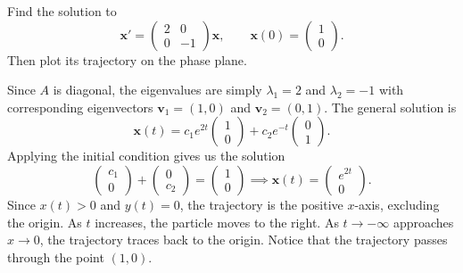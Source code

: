 \documentclass[11pt,letterpaper]{article}
\begin{document}
\begin{example}[1]{
Find the solution to 
\[
\mathbf{x}'=\begin{pmatrix}2&0\\0&-1\end{pmatrix}\mathbf{x},\qquad
\mathbf{x}(0)=\begin{pmatrix}1\\0\end{pmatrix}.
\]
Then plot its trajectory on the phase plane.
}

Since $A$ is diagonal, the eigenvalues are simply $\lambda_1=2$ and $\lambda_2=-1$ with corresponding eigenvectors $\textbf{v}_1=(1,0)$ and $\textbf{v}_2=(0,1)$. The general solution is
\[
\mathbf{x}(t)=c_1e^{2t}\begin{pmatrix}1\\0\end{pmatrix}
+c_2e^{-t}\begin{pmatrix}0\\1\end{pmatrix}.
\]
Applying the initial condition gives us the solution
\[
\begin{pmatrix}c_1\\0
\end{pmatrix} + \begin{pmatrix}
    0\\c_2
\end{pmatrix} = \begin{pmatrix}
    1\\0
\end{pmatrix}
\implies 
\mathbf{x}(t)=\begin{pmatrix}e^{2t}\\0\end{pmatrix}.
\]
Since $x(t)>0$ and $y(t)=0$, the trajectory is the positive $x$-axis, excluding the origin. As $t$ increases, the particle moves to the right. As $t\to-\infty$ approaches $x\to 0$, the trajectory traces back to the origin. Notice that the trajectory passes through the point $(1,0)$.

\begin{center}
\end{center}
\end{example}
\end{document}
